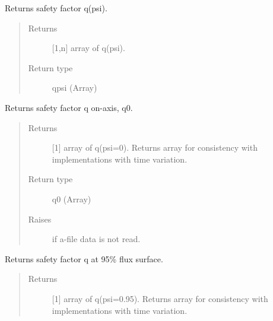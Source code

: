 \documentclass[letterpaper,10pt,english]{sphinxmanual}
\begin{document}
\begin{fulllineitems}
\begin{fulllineitems}
\label{\detokenize{eqtools:eqtools.eqdskreader.EqdskReader.getQProfile}}
Returns safety factor q(psi).
\begin{quote}\begin{description}
\item[{Returns}] \leavevmode
{[}1,n{]} array of q(psi).

\item[{Return type}] \leavevmode
qpsi (Array)

\end{description}\end{quote}

\end{fulllineitems}


\begin{fulllineitems}
\label{\detokenize{eqtools:eqtools.eqdskreader.EqdskReader.getQ0}}
Returns safety factor q on-axis, q0.
\begin{quote}\begin{description}
\item[{Returns}] \leavevmode
{[}1{]} array of q(psi=0).  Returns array for consistency
with {\hyperref[\detokenize{eqtools:eqtools.core.Equilibrium}]{}}
implementations with time variation.

\item[{Return type}] \leavevmode
q0 (Array)

\item[{Raises}] \leavevmode
{} \textendash{} if a-file data is not read.

\end{description}\end{quote}

\end{fulllineitems}


\begin{fulllineitems}
\label{\detokenize{eqtools:eqtools.eqdskreader.EqdskReader.getQ95}}
Returns safety factor q at 95\% flux surface.
\begin{quote}\begin{description}
\item[{Returns}] \leavevmode
{[}1{]} array of q(psi=0.95).  Returns array for consistency
with {\hyperref[\detokenize{eqtools:eqtools.core.Equilibrium}]{}}
implementations with time variation.


\end{description}
\end{quote}
\end{fulllineitems}
\end{fulllineitems}
\end{document}

